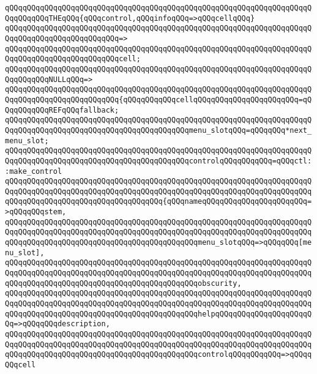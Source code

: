 \verb|qQQqqQQqqQQqqQQqqQQqqQQqqQQqqQQqqQQqqQQqqQQqqQQqqQQqqQQqqQQqqQQqqQQqqQQqqQQqqQQqTHEqQQq{qQQqcontrol,qQQqinfoqQQq=>qQQqcellqQQq}|\newline
\verb|qQQqqQQqqQQqqQQqqQQqqQQqqQQqqQQqqQQqqQQqqQQqqQQqqQQqqQQqqQQqqQQqqQQqqQQqqQQqqQQqqQQqqQQqqQQqqQQq=>|\newline
\verb|qQQqqQQqqQQqqQQqqQQqqQQqqQQqqQQqqQQqqQQqqQQqqQQqqQQqqQQqqQQqqQQqqQQqqQQqqQQqqQQqqQQqqQQqqQQqqQQqcell;|\newline
\newline
\verb|qQQqqQQqqQQqqQQqqQQqqQQqqQQqqQQqqQQqqQQqqQQqqQQqqQQqqQQqqQQqqQQqqQQqqQQqqQQqqQQqNULLqQQq=>|\newline
\verb|qQQqqQQqqQQqqQQqqQQqqQQqqQQqqQQqqQQqqQQqqQQqqQQqqQQqqQQqqQQqqQQqqQQqqQQqqQQqqQQqqQQqqQQqqQQqqQQq{qQQqqQQqqQQqcellqQQqqQQqqQQqqQQqqQQqqQQq=qQQqqQQqqQQqREFqQQqfallback;|\newline
\verb|qQQqqQQqqQQqqQQqqQQqqQQqqQQqqQQqqQQqqQQqqQQqqQQqqQQqqQQqqQQqqQQqqQQqqQQqqQQqqQQqqQQqqQQqqQQqqQQqqQQqqQQqqQQqqQQqmenu_slotqQQq=qQQqqQQq*next_menu_slot;|\newline
\newline
\verb|qQQqqQQqqQQqqQQqqQQqqQQqqQQqqQQqqQQqqQQqqQQqqQQqqQQqqQQqqQQqqQQqqQQqqQQqqQQqqQQqqQQqqQQqqQQqqQQqqQQqqQQqqQQqqQQqcontrolqQQqqQQqqQQq=qQQqctl::make_control|\newline
\verb|qQQqqQQqqQQqqQQqqQQqqQQqqQQqqQQqqQQqqQQqqQQqqQQqqQQqqQQqqQQqqQQqqQQqqQQqqQQqqQQqqQQqqQQqqQQqqQQqqQQqqQQqqQQqqQQqqQQqqQQqqQQqqQQqqQQqqQQqqQQqqQQqqQQqqQQqqQQqqQQqqQQqqQQqqQQqqQQq{qQQqnameqQQqqQQqqQQqqQQqqQQqqQQq=>qQQqqQQqstem,|\newline
\verb|qQQqqQQqqQQqqQQqqQQqqQQqqQQqqQQqqQQqqQQqqQQqqQQqqQQqqQQqqQQqqQQqqQQqqQQqqQQqqQQqqQQqqQQqqQQqqQQqqQQqqQQqqQQqqQQqqQQqqQQqqQQqqQQqqQQqqQQqqQQqqQQqqQQqqQQqqQQqqQQqqQQqqQQqqQQqqQQqqQQqqQQqmenu_slotqQQq=>qQQqqQQq[menu_slot],|\newline
\verb|qQQqqQQqqQQqqQQqqQQqqQQqqQQqqQQqqQQqqQQqqQQqqQQqqQQqqQQqqQQqqQQqqQQqqQQqqQQqqQQqqQQqqQQqqQQqqQQqqQQqqQQqqQQqqQQqqQQqqQQqqQQqqQQqqQQqqQQqqQQqqQQqqQQqqQQqqQQqqQQqqQQqqQQqqQQqqQQqqQQqqQQqobscurity,|\newline
\verb|qQQqqQQqqQQqqQQqqQQqqQQqqQQqqQQqqQQqqQQqqQQqqQQqqQQqqQQqqQQqqQQqqQQqqQQqqQQqqQQqqQQqqQQqqQQqqQQqqQQqqQQqqQQqqQQqqQQqqQQqqQQqqQQqqQQqqQQqqQQqqQQqqQQqqQQqqQQqqQQqqQQqqQQqqQQqqQQqqQQqqQQqhelpqQQqqQQqqQQqqQQqqQQqqQQq=>qQQqqQQqdescription,|\newline
\verb|qQQqqQQqqQQqqQQqqQQqqQQqqQQqqQQqqQQqqQQqqQQqqQQqqQQqqQQqqQQqqQQqqQQqqQQqqQQqqQQqqQQqqQQqqQQqqQQqqQQqqQQqqQQqqQQqqQQqqQQqqQQqqQQqqQQqqQQqqQQqqQQqqQQqqQQqqQQqqQQqqQQqqQQqqQQqqQQqqQQqqQQqcontrolqQQqqQQqqQQq=>qQQqqQQqcell|\newline
